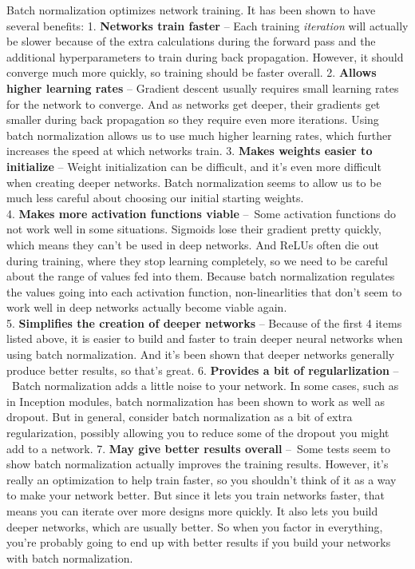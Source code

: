 \documentclass[11pt]{article}
\begin{document}
Batch normalization optimizes network training. It has been shown to
have several benefits: 1. \textbf{Networks train faster} -- Each
training \emph{iteration} will actually be slower because of the extra
calculations during the forward pass and the additional hyperparameters
to train during back propagation. However, it should converge much more
quickly, so training should be faster overall. 2. \textbf{Allows higher
learning rates} -- Gradient descent usually requires small learning
rates for the network to converge. And as networks get deeper, their
gradients get smaller during back propagation so they require even more
iterations. Using batch normalization allows us to use much higher
learning rates, which further increases the speed at which networks
train. 3. \textbf{Makes weights easier to initialize} -- Weight
initialization can be difficult, and it's even more difficult when
creating deeper networks. Batch normalization seems to allow us to be
much less careful about choosing our initial starting weights.\\
4. \textbf{Makes more activation functions viable} --~Some activation
functions do not work well in some situations. Sigmoids lose their
gradient pretty quickly, which means they can't be used in deep
networks. And ReLUs often die out during training, where they stop
learning completely, so we need to be careful about the range of values
fed into them. Because batch normalization regulates the values going
into each activation function, non-linearlities that don't seem to work
well in deep networks actually become viable again.\\
5. \textbf{Simplifies the creation of deeper networks} -- Because of the
first 4 items listed above, it is easier to build and faster to train
deeper neural networks when using batch normalization. And it's been
shown that deeper networks generally produce better results, so that's
great. 6. \textbf{Provides a bit of regularlization} --~Batch
normalization adds a little noise to your network. In some cases, such
as in Inception modules, batch normalization has been shown to work as
well as dropout. But in general, consider batch normalization as a bit
of extra regularization, possibly allowing you to reduce some of the
dropout you might add to a network. 7. \textbf{May give better results
overall} --~Some tests seem to show batch normalization actually
improves the training results. However, it's really an optimization to
help train faster, so you shouldn't think of it as a way to make your
network better. But since it lets you train networks faster, that means
you can iterate over more designs more quickly. It also lets you build
deeper networks, which are usually better. So when you factor in
everything, you're probably going to end up with better results if you
build your networks with batch normalization.
\end{document}
